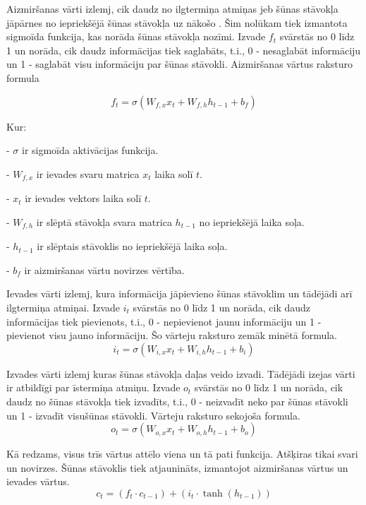 Aizmiršanas vārti izlemj, cik daudz no ilgtermiņa atmiņas jeb šūnas stāvokļa jāpārnes no iepriekšējā šūnas stāvokļa uz nākošo . Šim nolūkam tiek izmantota sigmoīda funkcija, kas norāda šūnas stāvokļa nozīmi. Izvade \(f_t\) svārstās no 0 līdz 1 un norāda, cik daudz informācijas tiek saglabāts, t.i., 0 - nesaglabāt informāciju un 1 - saglabāt visu informāciju par šūnas stāvokli. Aizmiršanas vārtus raksturo formula

\begin{equation}
f_t = \sigma \left( W_{f, x} x_t + W_{f, h} h_{t-1} + b_f \right)
\end{equation}

Kur:

- \( \sigma \) ir sigmoīda aktivācijas funkcija.

- \( W_{f, x} \) ir ievades svaru matrica  \( x_t \) laika solī \( t \).

- \( x_t \) ir ievades vektors laika solī  \( t \).

- \( W_{f, h} \)  ir slēptā stāvokļa svara matrica \( h_{t-1} \) no iepriekšējā laika soļa.

- \( h_{t-1} \) ir slēptais stāvoklis no iepriekšējā laika soļa.

- \( b_f \) ir aizmiršanas vārtu novirzes vērtība.

Ievades vārti izlemj, kura informācija jāpievieno šūnas stāvoklim un tādējādi arī ilgtermiņa atmiņai. Izvade \(i_t\) svārstās no 0 līdz 1 un norāda, cik daudz informācijas tiek pievienots, t.i., 0 - nepievienot jaunu informāciju un 1 - pievienot visu jauno informāciju. Šo vārteju raksturo zemāk minētā formula.
\begin{equation}
i_t = \sigma \left( W_{i, x} x_t + W_{i, h} h_{t-1} + b_i \right)
\end{equation}

Izvades vārti izlemj kuras šūnas stāvokļa daļas veido izvadi. Tādējādi izejas vārti ir atbildīgi par īstermiņa atmiņu. Izvade \(o_t\)  svārstās no 0 līdz 1 un norāda, cik daudz no šūnas stāvokļa tiek izvadīts, t.i., 0 - neizvadīt neko par šūnas stāvokli un 1 - izvadīt visušūnas stāvokli. Vārteju raksturo sekojoša formula.
\begin{equation}
o_t = \sigma \left( W_{o,x} x_t + W_{o,h} h_{t-1} + b_o \right)
\end{equation}

Kā redzams, visus trīs vārtus attēlo viena un tā pati funkcija. Atšķiras tikai svari un novirzes. Šūnas stāvoklis tiek atjaunināts, izmantojot aizmiršanas vārtus un ievades vārtus.
\begin{equation}
c_t = (f_t \cdot c_{t-1}) + (i_t \cdot \tanh(h_{t-1}))
\end{equation}


